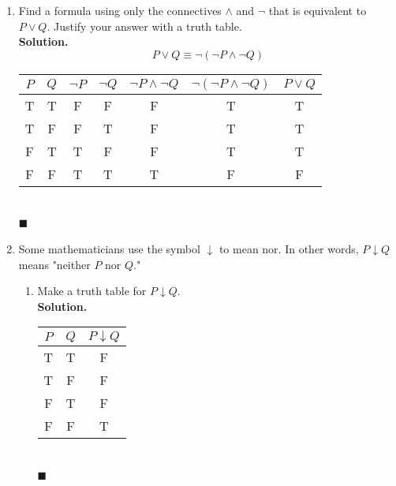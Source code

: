 \documentclass{report}
\newcommand{\sol}{\vspace{1em}\\\textbf{Solution.}\vspace{0.5em}}
\newcommand{\qed}{‎\\‎\hfill$\blacksquare$\vspace{1em}}
\begin{document}
\begin{enumerate}[leftmargin=*]
    \item Find a formula using only the connectives $\wedge$ and $\neg$ that is
          equivalent to $P \vee Q$. Justify your answer with a truth table. \sol{}
          \[
              P \vee Q \equiv \neg(\neg P \wedge \neg Q)
          \]
          \begin{center}
              \begin{tabular}{ccccccc}
                  $P$ & $Q$ & $\neg P$ & $\neg Q$ & $\neg P \wedge \neg Q$ & $\neg(\neg P \wedge \neg Q)$ & $P \vee Q$ \\
                  \hline
                  T   & T   & F        & F        & F                      & T                            & T          \\
                  T   & F   & F        & T        & F                      & T                            & T          \\
                  F   & T   & T        & F        & F                      & T                            & T          \\
                  F   & F   & T        & T        & T                      & F                            & F
              \end{tabular}
          \end{center}\qed

    \item Some mathematicians use the symbol $\downarrow$ to mean nor. In other words, $P
              \downarrow Q$ means "neither $P$ nor $Q$."
          \begin{enumerate}
              \item Make a truth table for $P \downarrow Q$. \sol{}
                    \begin{center}
                        \begin{tabular}{ccc}
                            $P$ & $Q$ & $P \downarrow Q$ \\
                            \hline
                            T   & T   & F                \\
                            T   & F   & F                \\
                            F   & T   & F                \\
                            F   & F   & T
                        \end{tabular}
                    \end{center}\qed


\end{enumerate}
\end{enumerate}
\end{document}
